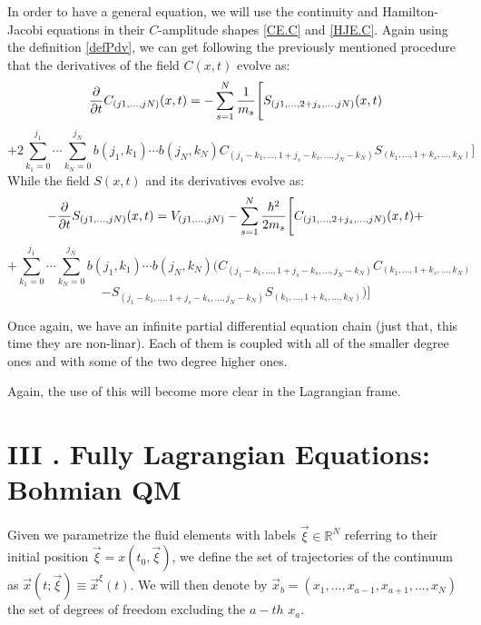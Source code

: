 \documentclass[11pt, a4paper]{article} %
\newcommand{\R}{\mathbb{R}} %
\begin{document}
In order to have a general equation, we will use the continuity and Hamilton-Jacobi equations in their $C$-amplitude shapes \eqref{CE.C} and \eqref{HJE.C}. Again using the definition \eqref{defPdv}, we can get following the previously mentioned procedure that the derivatives of the field $C(x,t)$ evolve as:
\begin{equation}\label{infchain.CE}
\pdv{}{t}C_{(j1,...,jN)}(x,t)=-\sum_{s=1}^N\frac{1}{m_s} \Bigg[S_{(j1,...,2+j_s,...,jN)}(x,t) 
\end{equation}
$$
+2 \sum_{k_1=0}^{j_1}\cdots\sum_{k_N=0}^{j_N} b(j_1,k_1)\cdots b(j_N,k_N)C_{(j_1-k_1,...,1+j_s-k_s,...,j_N-k_N)}S_{(k_1,...,1+k_s,...,k_N)} \Bigg]
$$
While the field $S(x,t)$ and its derivatives evolve as:
\begin{equation}\label{infchain.HJE}
-\pdv{}{t}S_{(j1,...,jN)}(x,t)=V_{(j1,...,jN)}-\sum_{s=1}^N\frac{\hbar^2}{2m_s} \Bigg[ C_{(j1,...,2+j_s,...,jN)}(x,t)+
\end{equation}
$$
+\sum_{k_1=0}^{j_1}\cdots\sum_{k_N=0}^{j_N} b(j_1,k_1)\cdots b(j_N,k_N) \Bigg( C_{(j_1-k_1,...,1+j_s-k_s,...,j_N-k_N)}C_{(k_1,...,1+k_s,...,k_N)} 
$$
$$
-S_{(j_1-k_1,...,1+j_s-k_s,...,j_N-k_N)}S_{(k_1,...,1+k_s,...,k_N)}  \Bigg)\Bigg]
$$

Once again, we have an infinite partial differential equation chain (just that, this time they are non-linar). Each of them is coupled with all of the smaller degree ones and with some of the two degree higher ones.

Again, the use of this will become more clear in the Lagrangian frame.


\section*{III . Fully Lagrangian Equations: Bohmian QM}
Given we parametrize the fluid elements with labels $\vec{\xi}\in\R^N$ referring to their initial position $\vec{\xi}=x(t_0, \vec{\xi})$, we define the set of trajectories of the continuum as $\vec{x}(t;\vec{\xi}) \equiv \vec{x}^\xi(t)$. We will then denote by $\vec{x}_b=(x_1,...,x_{a-1}, x_{a+1},...,x_N)$ the set of degrees of freedom excluding the $a-th$ $x_a$.
\end{document}
